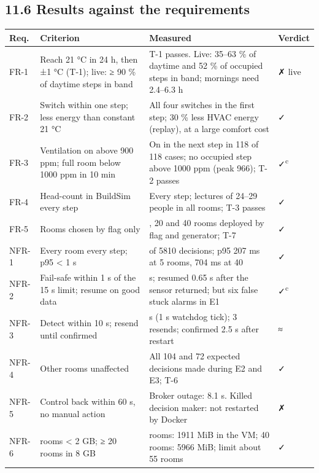 \documentclass[11pt]{article}
\makeatletter
\DeclareRobustCommand{\_}{\ifmmode\nfss@text{\textunderscore}\else\textunderscore\allowbreak\fi}
\makeatother
\begin{document}
\subsection{11.6 Results against the requirements}

\begin{longtable}[]{@{}
  >{\raggedright\arraybackslash}p{}
  >{\raggedright\arraybackslash}p{}
  >{\raggedright\arraybackslash}p{}
  >{\raggedright\arraybackslash}p{}@{}}
\toprule
\textbf{Req.} & \textbf{Criterion} & \textbf{Measured} & \textbf{Verdict} \\
\midrule
\endhead
FR-1 & Reach 21 °C in 24 h, then ±1 °C (T-1); live: ≥ 90 \% of daytime steps in band & T-1 passes. Live: 35–63 \% of daytime and 52 \% of occupied steps in band; mornings need 2.4–6.3 h & ✗ live \\
FR-2 & Switch within one step; less energy than constant 21 °C & All four switches in the first step; 30 \% less HVAC energy (replay), at a large comfort cost & ✓ \\
FR-3 & Ventilation on above 900 ppm; full room below 1000 ppm in 10 min & On in the next step in 118 of 118 cases; no occupied step above 1000 ppm (peak 966); T-2 passes & ✓\textsuperscript{c} \\
FR-4 & Head-count in BuildSim every step & Every step; lectures of 24–29 people in all rooms; T-3 passes & ✓ \\
FR-5 & Rooms chosen by flag only & 5, 20 and 40 rooms deployed by flag and generator; T-7 & ✓ \\
NFR-1 & Every room every step; p95 < 1 s & 5808 of 5810 decisions; p95 207 ms at 5 rooms, 704 ms at 40 & ✓ \\
NFR-2 & Fail-safe within 1 s of the 15 s limit; resume on good data & 15.9 s; resumed 0.65 s after the sensor returned; but six false stuck alarms in E1 & ✓\textsuperscript{c} \\
NFR-3 & Detect within 10 s; resend until confirmed & 10.9 s (1 s watchdog tick); 3 resends; confirmed 2.5 s after restart & ≈ \\
NFR-4 & Other rooms unaffected & All 104 and 72 expected decisions made during E2 and E3; T-6 & ✓ \\
NFR-5 & Control back within 60 s, no manual action & Broker outage: 8.1 s. Killed decision maker: not restarted by Docker & ✗ \\
NFR-6 & 5 rooms < 2 GB; ≥ 20 rooms in 8 GB & 5 rooms: 1911 MiB in the VM; 40 rooms: 5966 MiB; limit about 55 rooms & ✓ \\
\bottomrule
\end{longtable}
\end{document}
